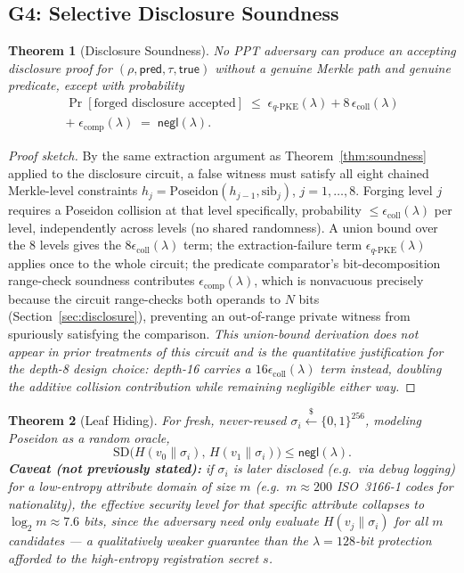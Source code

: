\documentclass[journal,twoside,10pt]{IEEEtran}
\newtheorem{theorem}{Theorem}
\begin{document}
\subsection{G4: Selective Disclosure Soundness}
\begin{theorem}[Disclosure Soundness]
\label{thm:disclosure}
No PPT adversary can produce an accepting disclosure proof for
$(\rho,\mathsf{pred},\tau,\mathsf{true})$ without a genuine Merkle path and
genuine predicate, except with probability
\begin{multline}
\Pr[\text{forged disclosure accepted}] \;\le\;
\epsilon_{q\text{-PKE}}(\lambda) + 8\,\epsilon_{\mathrm{coll}}(\lambda) \\
+\; \epsilon_{\mathrm{comp}}(\lambda)
\;=\; \mathsf{negl}(\lambda).
\label{eq:disclosure_bound}
\end{multline}
\end{theorem}
\begin{proof}[Proof sketch]
By the same extraction argument as Theorem~\ref{thm:soundness} applied to
the disclosure circuit, a false witness must satisfy all eight chained
Merkle-level constraints $h_j=\mathrm{Poseidon}(h_{j-1},\mathrm{sib}_j)$,
$j=1,\ldots,8$. Forging level $j$ requires a Poseidon collision at that
level specifically, probability $\le\epsilon_{\mathrm{coll}}(\lambda)$ per
level, independently across levels (no shared randomness). A union bound
over the 8 levels gives the $8\epsilon_{\mathrm{coll}}(\lambda)$ term; the
extraction-failure term $\epsilon_{q\text{-PKE}}(\lambda)$ applies once to
the whole circuit; the predicate comparator's bit-decomposition
range-check soundness contributes $\epsilon_{\mathrm{comp}}(\lambda)$,
which is nonvacuous precisely because the circuit range-checks both
operands to $N$ bits (Section~\ref{sec:disclosure}), preventing an
out-of-range private witness from spuriously satisfying the comparison.
\textit{This union-bound derivation does not appear in prior treatments of
this circuit and is the quantitative justification for the depth-8 design
choice: depth-16 carries a $16\epsilon_{\mathrm{coll}}(\lambda)$ term
instead, doubling the additive collision contribution while remaining
negligible either way.}
\end{proof}

\begin{theorem}[Leaf Hiding]
\label{thm:hiding}
For fresh, never-reused $\sigma_i\xleftarrow{\$}\{0,1\}^{256}$, modeling
Poseidon as a random oracle,
\begin{equation}
\mathrm{SD}\big(H(v_0\|\sigma_i),\,H(v_1\|\sigma_i)\big) \le \mathsf{negl}(\lambda).
\label{eq:hiding_bound}
\end{equation}
\textbf{Caveat (not previously stated):} if $\sigma_i$ is later disclosed
(e.g.\ via debug logging) for a low-entropy attribute domain of size $m$
(e.g.\ $m\approx200$ ISO~3166-1 codes for nationality), the effective
security level for that specific attribute collapses to $\log_2 m\approx7.6$
bits, since the adversary need only evaluate $H(v_j\|\sigma_i)$ for all $m$
candidates --- a qualitatively weaker guarantee than the $\lambda=128$-bit
protection afforded to the high-entropy registration secret $s$.
\end{theorem}
\end{document}
